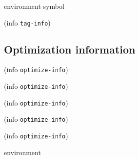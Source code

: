  {environment symbol}



 {(info {\tt tag-info})}

\subsection{Optimization information}







 {(info {\tt optimize-info})}

 {(info {\tt optimize-info})}

 {(info {\tt optimize-info})}

 {(info {\tt optimize-info})}

 {(info {\tt optimize-info})}

 {environment}

